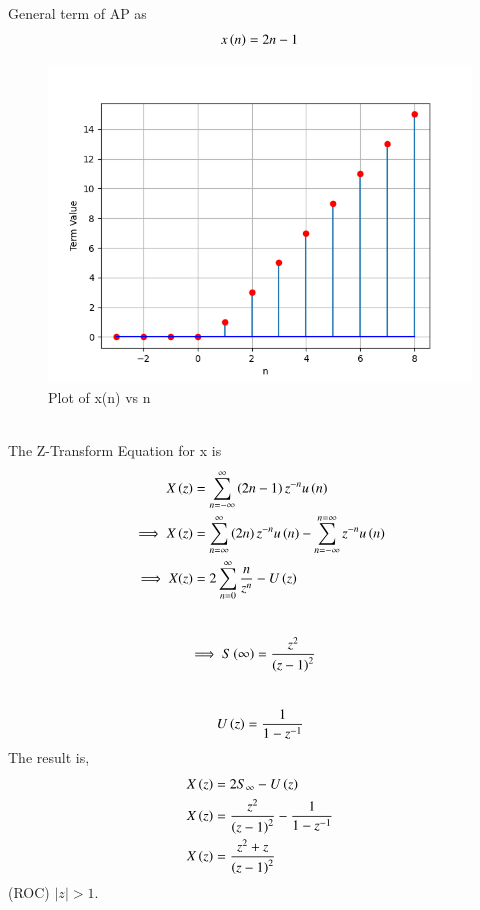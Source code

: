 \documentclass[journal,12pt,twocolumn]{IEEEtran}
\theoremstyle{remark}
\begin{document}
General term of AP as 
\begin{align}
    x\left(n\right)=2n-1
\end{align}
\begin{figure}[!h]
    \centering
    \includegraphics[width=1.0\linewidth]{test.png}
    \caption{Plot of x(n) vs n}
    \label{fig:1}
\end{figure}\\
The Z-Transform Equation for x is\\
\begin{align}
    X\left(z\right)&=\sum_{n=-\infty}^{\infty}\left(2n-1\right)z^{-n}u\left(n\right) \\ \implies X\left(z\right)&=\sum_{n=\infty}^{\infty}\left(2n\right)z^{-n}u\left(n\right) -\sum_{n=-\infty}^{n=\infty}z^{-n}u\left(n\right)\\
   \implies X(z)&=2\sum_{n=0}^{\infty}\dfrac{n}{z^{n}}-U\left(z\right)
\end{align}
\\
\begin{align}
   \implies S\left(\infty\right)&=\dfrac{z^2}{\left(z-1\right)^{2}}
\end{align}
\\
\begin{align}
   U\left(z\right)=\dfrac{1}{1-z^{-1}}
\end{align}
The result is,
\begin{align}
    X\left(z\right)&=2S_\infty-U\left(z\right)\\
    X\left(z\right)&=\dfrac{z^2}{\left(z-1\right)^{2}}-\dfrac{1}{1-z^{-1}}\\
    X\left(z\right)&=\dfrac{z^2+z}{\left(z-1\right)^{2}}
\end{align}
(ROC) \(|z| > 1\).\\
\end{document}
